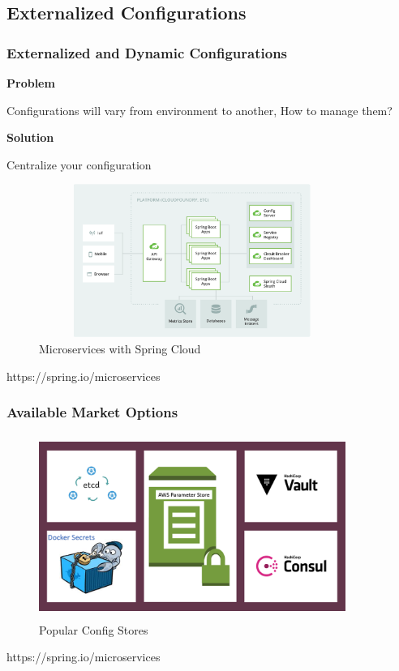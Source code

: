 \documentclass{beamer}
\begin{document}
	\subsection {Externalized Configurations}
		\begin{frame}
			\frametitle{Externalized and \color{green} {Dynamic Configurations}}
				\textbf {Problem} \par
					\hspace{3mm}\small {Configurations will vary from environment to another, How to manage them?}
				
				\vspace{2mm}
				\textbf {Solution} \par	
					\hspace{3mm}\small {Centralize your configuration} 
				
				\begin{figure}[h]
					\includegraphics[width=100mm,height=50mm, scale=1]{img/microservice-diagrame.png}
					\caption{Microservices with Spring Cloud}
				\end{figure}\vspace{20mm}
				
				\tiny{https://spring.io/microservices}	
		\end{frame}
	
	\begin{frame}
		\frametitle{Available Market Options}
			
			\begin{figure}[h]
				\includegraphics[width=100mm,height=60mm,  scale=1]{img/Configs.png}
				\caption{Popular Config Stores}
			\end{figure}\vspace{20mm}
			
			\tiny{https://spring.io/microservices}	
	\end{frame}
\end{document}
